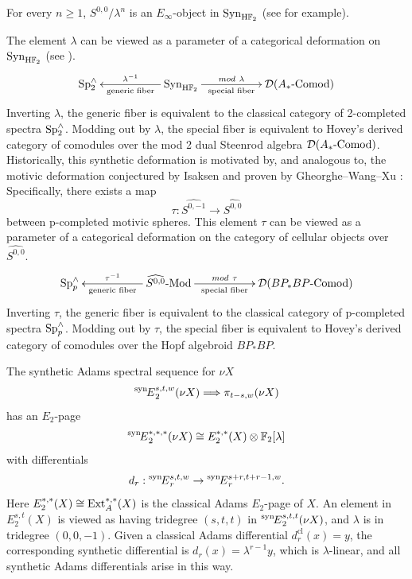 \documentclass{amsart}
\numberwithin{equation}{section}
\newcommand{\SynSS}{\prescript{\mathrm{syn}\!}{}{E}}
\newcommand{\HF}{\mathrm{H}\bF_2}
\begin{document}
\begin{remark}
For every $n\ge 1$, $S^{0,0}/\lambda^n$ is an $E_\infty$-object in $\mathrm{Syn}_{\HF}$ (see \cite[Appendix B, C]{BHSmot} for example).
\end{remark}

\begin{remark} \label{rem:deformation}
The element $\lambda$ can be viewed as a parameter of a categorical deformation on $\mathrm{Syn}_{\HF}$ (see \cite{Pst}). 
$$\xymatrix{\textup{Sp}^\wedge_2 & & \mathrm{Syn}_{\HF}\ar[ll]_-{\lambda^{-1}}^-{\textup{generic fiber}} \ar[rr]^-{mod ~  \lambda}_-{\textup{special fiber}} & & \mathcal{D}(A_*\textup{-Comod})}$$
Inverting $\lambda$, the generic fiber is equivalent to the classical category of 2-completed spectra $\textup{Sp}^\wedge_2$. Modding out by $\lambda$, the special fiber is equivalent to Hovey's derived category \cite{Hovey} of comodules over the mod 2 dual Steenrod algebra $\mathcal{D}(A_*\textup{-Comod})$. Historically, this synthetic deformation is motivated by, and analogous to, the motivic deformation conjectured by Isaksen and proven by Gheorghe--Wang--Xu \cite{GWX}: Specifically, there exists a map
$$\tau: \widehat{S^{0,-1}} \rightarrow \widehat{S^{0,0}}$$
between p-completed motivic spheres. This element $\tau$
can be viewed as a parameter of a categorical deformation on the category of cellular objects over $\widehat{S^{0,0}}$. 
$$\xymatrix{\textup{Sp}^\wedge_p & & \widehat{S^{0,0}}\textup{-Mod}\ar[ll]_-{\tau^{-1}}^-{\textup{generic fiber}} \ar[rr]^-{mod ~  \tau}_-{\textup{special fiber}} & & \mathcal{D}(BP_*BP\textup{-Comod})}$$
Inverting $\tau$, the generic fiber is equivalent to the classical category of p-completed spectra $\textup{Sp}^\wedge_p$. Modding out by $\tau$, the special fiber is equivalent to Hovey's derived category of comodules over the Hopf algebroid $BP_*BP$. 
\end{remark}

\begin{theorem} \label{thm:rigid}
    The synthetic Adams spectral sequence for $\nu X$
     $$\SynSS_2^{s,t,w}(\nu X)\Longrightarrow \pi_{t-s,w}(\nu X)$$
     has an $E_2$-page 
    $$\SynSS_2^{*,*,*}(\nu X) \cong E_2^{*,*}(X)\otimes \mathbb{F}_2[\lambda]$$
    with differentials
    $$d_r: \SynSS_r^{s,t,w}\to \SynSS_r^{s+r,t+r-1,w}.$$
    Here $E_2^{*,*}(X) \cong \mathrm{Ext}_A^{*,*}(X)$ is the classical Adams $E_2$-page of $X$. An element in $E_2^{s,t}(X)$ is viewed as having tridegree $(s, t, t)$ in $\SynSS_2^{s,t,t}(\nu X)$, and $\lambda$ is in tridegree $(0, 0, -1)$. Given a classical Adams differential $d_r^{\mathrm{cl}}(x)=y$, the corresponding synthetic differential is $d_r(x)=\lambda^{r-1}y$, which is $\lambda$-linear, and all synthetic Adams differentials arise in this way.
\end{theorem}
\end{document}
